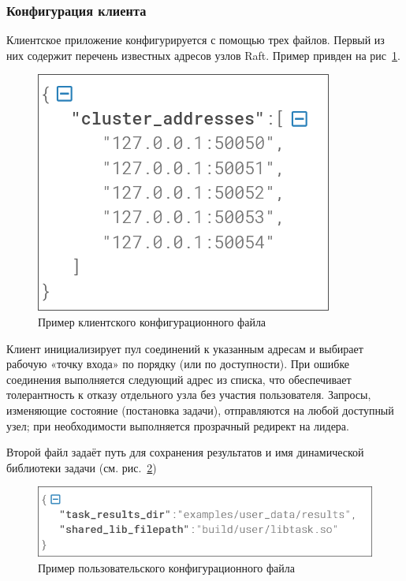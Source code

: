 \subsubsection{Конфигурация клиента}

Клиентское приложение конфигурируется с помощью трех файлов. Первый из них
содержит перечень известных адресов узлов Raft. Пример привден на
рис~\ref{fig:client_config}.

\begin{figure}
  \centering
  \includegraphics[scale=0.4]{inc/client-config.png}
  \caption{Пример клиентского конфигурационного файла}
  \label{fig:client_config}
\end{figure}

Клиент инициализирует пул соединений к указанным адресам и выбирает рабочую
«точку входа» по порядку (или по доступности). При ошибке соединения
выполняется следующий адрес из списка, что обеспечивает толерантность к отказу
отдельного узла без участия пользователя. Запросы, изменяющие состояние
(постановка задачи), отправляются на любой доступный узел; при необходимости
выполняется прозрачный редирект на лидера.

Второй файл задаёт путь для сохранения результатов и имя динамической
библиотеки задачи (см. рис.~\ref{fig:user_config})

\begin{figure}
  \centering
  \includegraphics[scale=0.4]{inc/user-config.png}
  \caption{Пример пользовательского конфигурационного файла}
  \label{fig:user_config}
\end{figure}


